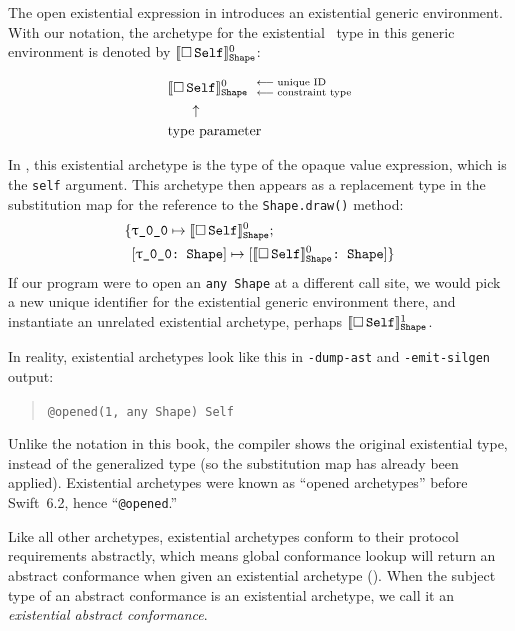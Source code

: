 \documentclass[../generics]{subfiles}
\begin{document}
\begin{example}\label{ex:existential self archetype}
The open existential expression in  introduces an existential generic environment. With our notation, the archetype for the existential \tSelf\ type in this generic environment is denoted by $[\![\Box\,\texttt{Self}]\!]^0_\texttt{Shape}$:
\begin{ceqn}
\begin{align*}
& [\![\Box\,\texttt{Self}]\!]^0_\texttt{Shape} \phantom{n} {}^{\longleftarrow \; \text{unique ID}}_{\longleftarrow \; \text{constraint type}} \\
& \hskip1.5em \uparrow \\
& \text{type parameter}
\end{align*}
\end{ceqn}

In , this existential archetype is the type of the opaque value expression, which is the \texttt{self} argument. This archetype then appears as a replacement type in the substitution map for the reference to the \texttt{Shape.draw()} method:
\begin{align*}
\SubstMapC{&\SubstType{\rT}{$\ESelf^0_\texttt{Shape}$}}{\\
&\SubstConf{\rT}{$\ESelf^0_\texttt{Shape}$}{Shape}}
\end{align*}
If our program were to open an \texttt{any~Shape} at a different call site, we would pick a new unique identifier for the existential generic environment there, and instantiate an unrelated existential archetype, perhaps $[\![\Box\,\texttt{Self}]\!]^1_\texttt{Shape}$.

In reality, existential archetypes look like this in \texttt{-dump-ast} and \texttt{-emit-silgen} output:
\begin{quote}
\verb|@opened(1, any Shape) Self|
\end{quote}
Unlike the notation in this book, the compiler shows the original existential type, instead of the generalized type (so the substitution map has already been applied). Existential archetypes were known as ``opened archetypes'' before Swift~6.2, hence ``\verb|@opened|.''
\end{example}

Like all other archetypes, existential archetypes conform to their protocol requirements abstractly, which means global conformance lookup will return an abstract conformance when given an existential archetype (). When the subject type of an abstract conformance is an existential archetype, we call it an \emph{existential abstract conformance}.
\end{document}

